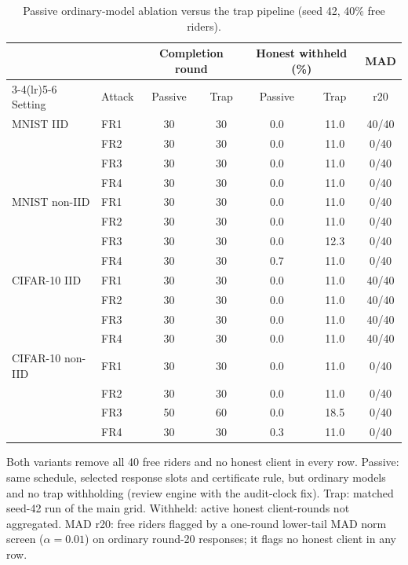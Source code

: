 \begin{table}[t]\centering\scriptsize\setlength{\tabcolsep}{3.6pt}
\caption{Passive ordinary-model ablation versus the trap pipeline (seed 42, 40\% free riders).}\label{tab:passive}
\begin{tabular}{llcccc@{\hspace{8pt}}c}\toprule
& & \multicolumn{2}{c}{Completion round} & \multicolumn{2}{c}{Honest withheld (\%)} & MAD \\
\cmidrule(lr){3-4}\cmidrule(lr){5-6}
Setting & Attack & Passive & Trap & Passive & Trap & r20 \\ \midrule
MNIST IID & FR1 & 30 & 30 & 0.0 & 11.0 & 40/40 \\
 & FR2 & 30 & 30 & 0.0 & 11.0 & 0/40 \\
 & FR3 & 30 & 30 & 0.0 & 11.0 & 0/40 \\
 & FR4 & 30 & 30 & 0.0 & 11.0 & 0/40 \\
\midrule
MNIST non-IID & FR1 & 30 & 30 & 0.0 & 11.0 & 0/40 \\
 & FR2 & 30 & 30 & 0.0 & 11.0 & 0/40 \\
 & FR3 & 30 & 30 & 0.0 & 12.3 & 0/40 \\
 & FR4 & 30 & 30 & 0.7 & 11.0 & 0/40 \\
\midrule
CIFAR-10 IID & FR1 & 30 & 30 & 0.0 & 11.0 & 40/40 \\
 & FR2 & 30 & 30 & 0.0 & 11.0 & 40/40 \\
 & FR3 & 30 & 30 & 0.0 & 11.0 & 40/40 \\
 & FR4 & 30 & 30 & 0.0 & 11.0 & 40/40 \\
\midrule
CIFAR-10 non-IID & FR1 & 30 & 30 & 0.0 & 11.0 & 0/40 \\
 & FR2 & 30 & 30 & 0.0 & 11.0 & 0/40 \\
 & FR3 & 50 & 60 & 0.0 & 18.5 & 0/40 \\
 & FR4 & 30 & 30 & 0.3 & 11.0 & 0/40 \\
\bottomrule
\end{tabular}
\par\smallskip\parbox{\columnwidth}{\scriptsize Both variants remove all 40 free riders and no honest client in every row. Passive: same schedule, selected response slots and certificate rule, but ordinary models and no trap withholding (review engine with the audit-clock fix). Trap: matched seed-42 run of the main grid. Withheld: active honest client-rounds not aggregated. MAD r20: free riders flagged by a one-round lower-tail MAD norm screen ($\alpha=0.01$) on ordinary round-20 responses; it flags no honest client in any row.}
\end{table}
